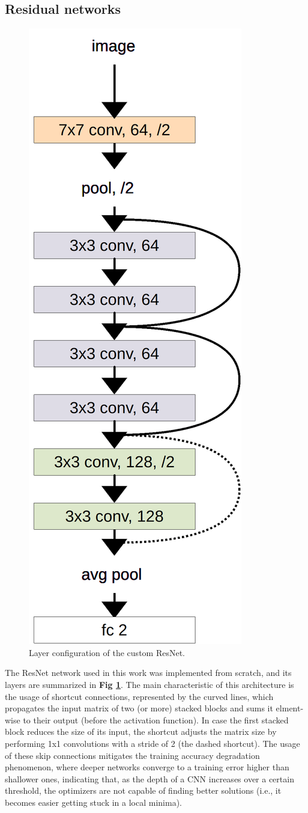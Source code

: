
\subsection{Residual networks} %

\begin{figure}[ht!]
    \centering
    \includegraphics[height=0.7\linewidth, angle=90]{images/convLayers.png}
    \caption{Layer configuration of the custom ResNet.}
    \label{fig:resnet_layers}
\end{figure}
\noindent
The ResNet network used in this work was implemented from scratch, and its layers are summarized in \textbf{Fig \ref{fig:resnet_layers}}. The main characteristic of this architecture is the usage of shortcut connections, represented by the curved lines, which propagates the input matrix of two (or more) stacked blocks and sums it elment-wise to their output (before the activation function). In case the first stacked block reduces the size of its input, the shortcut adjusts the matrix size by performing 1x1 convolutions with a stride of 2 (the dashed shortcut).
The usage of these skip connections mitigates the training accuracy degradation phenomenon, where deeper networks converge to a training error higher than shallower ones, indicating that, as the depth of a CNN increases over a certain threshold, the optimizers are not capable of finding better solutions (i.e., it becomes easier getting stuck in a local minima).


